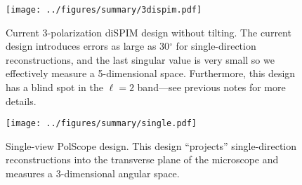 \documentclass[11pt]{article}
\begin{document}
\begin{figure}[H]
 \captionsetup{width=1.0\linewidth}
 \centering
 \texttt{[image: ../figures/summary/3dispim.pdf]}
 \vspace{-1.55em}
 \caption{Current 3-polarization diSPIM design without tilting. The current
   design introduces errors as large as 30${}^{\circ}$ for single-direction
   reconstructions, and the last singular value is very small so we effectively
   measure a 5-dimensional space. Furthermore, this design has a blind spot in
   the $\ell=2$ band---see previous notes for more details. }
 \label{6pol}
\end{figure}

\begin{figure}[H]
 \captionsetup{width=1.0\linewidth}
 \centering
 \texttt{[image: ../figures/summary/single.pdf]}
 \vspace{-3em}
 \caption{Single-view PolScope design. This design ``projects'' single-direction
   reconstructions into the transverse plane of the microscope and measures a
   3-dimensional angular space.}
 \label{6pol}
\end{figure}
\end{document}
